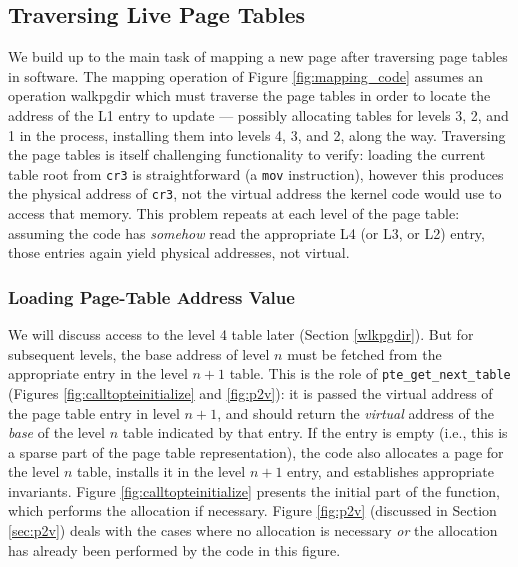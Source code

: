 \subsection{Traversing Live Page Tables}
\label{sec:traversing}
We build up to the main task of mapping a new page after traversing page tables in software.
The mapping operation of Figure \ref{fig:mapping_code} assumes an operation \textsf{walkpgdir} which must traverse the page tables
in order to locate the address of the L1 entry to update --- possibly allocating tables for levels 3, 2, and 1 in the process,
installing them into levels 4, 3, and 2, along the way.
Traversing the page tables is itself challenging functionality to verify: loading the current table root from \lstinline|cr3| is straightforward
(a \lstinline|mov| instruction), however this produces the physical address of \lstinline|cr3|, not the virtual address the kernel code would use to access that memory.
This problem repeats at each level of the page table: assuming the code has \emph{somehow} read the appropriate L4 (or L3, or L2) entry, those entries again
yield physical addresses, not virtual.

\subsubsection{Loading Page-Table Address Value}
We will discuss access to the level 4 table later (Section \ref{wlkpgdir}). But for subsequent levels, the base address of level $n$ must be
fetched from the appropriate entry in the level $n+1$ table.
This is the role of \lstinline|pte_get_next_table| (Figures \ref{fig:calltopteinitialize} and \ref{fig:p2v}):
it is passed the virtual address of the page table entry in level $n+1$, and should return the \emph{virtual} 
address of the \emph{base} of the level $n$ table
indicated by that entry.
If the entry is empty (i.e., this is a sparse part of the page table representation),
the code also allocates a page for the level $n$ table, installs it in the level $n+1$ entry, and establishes appropriate invariants.
Figure \ref{fig:calltopteinitialize} presents the initial part of the function, which performs the allocation if necessary.
Figure \ref{fig:p2v} (discussed in Section \ref{sec:p2v}) deals with the cases where no allocation is necessary \emph{or} the allocation has already
been performed by the code in this figure.

